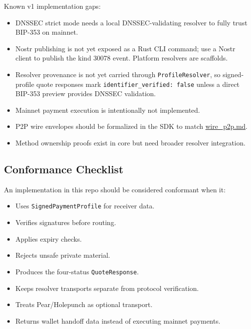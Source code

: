 \documentclass[
]{article}
\providecommand{\tightlist}{%
  \setlength{\itemsep}{0pt}\setlength{\parskip}{0pt}}
\begin{document}
Known v1 implementation gaps:

\begin{itemize}
\tightlist
\item
  DNSSEC strict mode needs a local DNSSEC-validating resolver to fully
  trust BIP-353 on mainnet.
\item
  Nostr publishing is not yet exposed as a Rust CLI command; use a Nostr
  client to publish the kind 30078 event. Platform resolvers are
  scaffolds.
\item
  Resolver provenance is not yet carried through
  \texttt{ProfileResolver}, so signed-profile quote responses mark
  \texttt{identifier\_verified:\ false} unless a direct BIP-353 preview
  provides DNSSEC validation.
\item
  Mainnet payment execution is intentionally not implemented.
\item
  P2P wire envelopes should be formalized in the SDK to match
  \href{./wire_p2p.md}{wire\_p2p.md}.
\item
  Method ownership proofs exist in core but need broader resolver
  integration.
\end{itemize}

\hypertarget{conformance-checklist}{%
\subsection{Conformance Checklist}\label{conformance-checklist}}

An implementation in this repo should be considered conformant when it:

\begin{itemize}
\tightlist
\item
  Uses \texttt{SignedPaymentProfile} for receiver data.
\item
  Verifies signatures before routing.
\item
  Applies expiry checks.
\item
  Rejects unsafe private material.
\item
  Produces the four-status \texttt{QuoteResponse}.
\item
  Keeps resolver transports separate from protocol verification.
\item
  Treats Pear/Holepunch as optional transport.
\item
  Returns wallet handoff data instead of executing mainnet payments.
\end{itemize}
\end{document}

